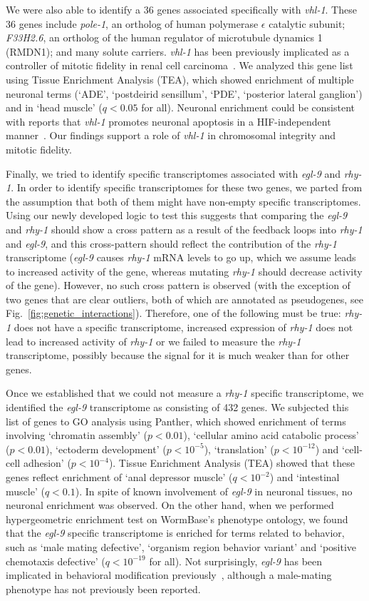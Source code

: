 \documentclass[9pt,twocolumn,twoside]{pnas-new}
\newcommand{\egl}{\emph{egl-9}}
\newcommand{\rhy}{\emph{rhy-1}}
\newcommand{\vhl}{\emph{vhl-1}}
\newcommand{\egltargets}{432}
\newcommand{\vhltargets}{36}
\begin{document}
We were also able to identify a \vhltargets{} genes associated specifically with
\vhl{}. These \vhltargets{} genes include \emph{pole-1}, an ortholog of human
polymerase $\epsilon$ catalytic subunit; \emph{F33H2.6}, an ortholog of the human
regulator of microtubule dynamics 1 (RMDN1)\cite{}; and many solute carriers.
\vhl{} has been previously implicated as a controller of mitotic fidelity in
renal cell carcinoma~\cite{Hell2014}. We analyzed this gene list using Tissue
Enrichment Analysis (TEA), which showed enrichment of multiple neuronal terms
(`ADE', `postdeirid sensillum', `PDE', `posterior lateral ganglion') and in
`head muscle' ($q<0.05$ for all). Neuronal enrichment could be consistent with
reports that \vhl{} promotes neuronal apoptosis in a HIF-independent
manner~\cite{}. Our findings support a role of \vhl{} in chromosomal integrity
and mitotic fidelity.

Finally, we tried to identify specific transcriptomes associated with \egl{} and
\rhy{}. In order to identify specific transcriptomes for these two genes, we
parted from the assumption that both of them might have non-empty specific
transcriptomes. Using our newly developed logic to test this suggests that
comparing the \egl{} and \rhy{} should show a cross pattern as a result of the
feedback loops into \rhy{} and \egl{}, and this cross-pattern should reflect the
contribution of the \rhy{} transcriptome (\egl{} causes \rhy{} mRNA levels to go
up, which we assume leads to increased activity of the gene, whereas mutating
\rhy{} should decrease activity of the gene).
However, no such cross pattern is observed (with the exception of two genes that
are clear outliers, both of which are annotated as pseudogenes, see
Fig.~\ref{fig:genetic_interactions}). Therefore, one of the following must be
true: \rhy{} does not have a specific transcriptome, increased expression of
\rhy{} does not lead to increased activity of \rhy{} or we failed to measure the
\rhy{} transcriptome, possibly because the signal for it is much weaker than for
other genes.

Once we established that we could not measure a \rhy{} specific transcriptome,
we identified the \egl{} transcriptome as consisting of \egltargets{} genes. We
subjected this list of genes to GO analysis using Panther, which showed
enrichment of terms involving `chromatin assembly' ($p<0.01$), `cellular amino
acid catabolic process' ($p<0.01$), `ectoderm development' ($p<10^{-5}$),
`translation' ($p<10^{-12}$) and `cell-cell adhesion' ($p<10^{-4}$). Tissue
Enrichment Analysis (TEA) showed that these genes reflect enrichment of `anal
depressor muscle' ($q<10^{-2}$) and `intestinal muscle' ($q<0.1$).
In spite of known involvement of \egl{} in neuronal tissues, no neuronal
enrichment was observed. On the other hand, when we performed hypergeometric
enrichment test on WormBase's phenotype ontology, we found that the \egl{}
specific transcriptome is enriched for terms related to behavior, such as `male
mating defective', `organism region behavior variant' and `positive chemotaxis
defective' ($q<10^{-19}$ for all). Not surprisingly, \egl{} has been implicated
in behavioral modification previously~\cite{Chang2008,Gray2004}, although a
male-mating phenotype has not previously been reported.
\end{document}
